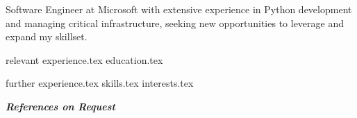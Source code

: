 \documentclass[letterpaper,12pt]{article}
\begin{document}
\thispagestyle{empty}

\vspace{0.8cm} 

Software Engineer at Microsoft with extensive experience in Python development and managing critical infrastructure, seeking new opportunities to leverage and expand my skillset.


{relevant experience.tex}
{education.tex}


{further experience.tex}
{skills.tex}
{interests.tex}
\thispagestyle{empty}

\vspace*{\fill}
\centering
\textit{\textbf{References on Request}}
\end{document}
